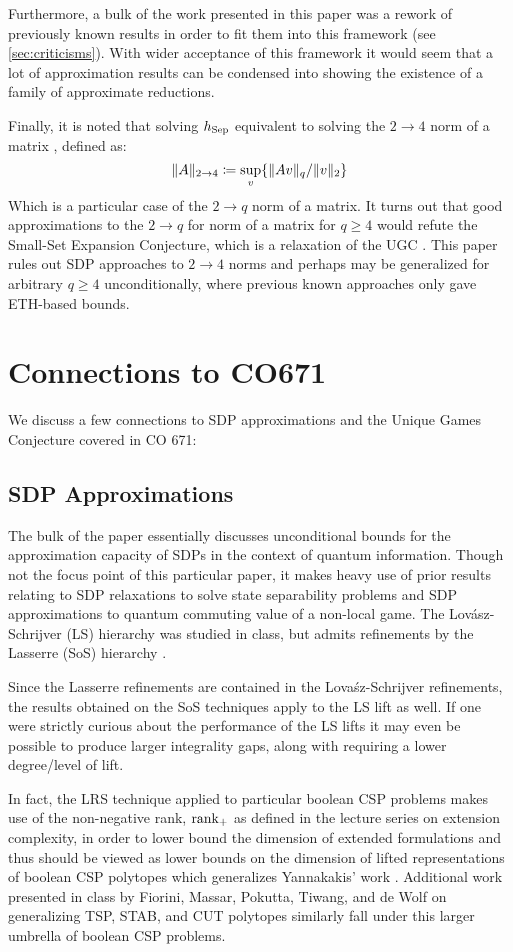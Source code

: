 \documentclass[runningheads,a4paper,english]{llncs}[2022/01/12]
\begin{document}
Furthermore, a bulk of the work presented in this paper was a rework of previously known results in order to fit them into this framework (see \cref{sec:criticisms}). 
With wider acceptance of this framework it would seem that a lot of approximation results can be condensed into showing the existence of a family of approximate reductions.

Finally, it is noted that solving $h_{\operatorname{Sep}}$ equivalent to solving the $2\to 4$ norm of a matrix \cite{Barak_2012}, defined as:
\[\lVert A\rVert_{2\to 4} \coloneq \sup_v \{\lVert Av\rVert_q/\lVert v\rVert_2\}\]
Which is a particular case of the $2\to q$ norm of a matrix.
It turns out that good approximations to the $2\to q$ for norm of a matrix for $q \ge 4$ would refute the Small-Set Expansion Conjecture, which is a relaxation of the UGC \cite{Barak_2012}.
This paper rules out SDP approaches to $2\to 4$ norms and perhaps may be generalized for arbitrary $q \ge 4$ unconditionally, where previous known approaches only gave ETH-based bounds.

\section{Connections to CO671}
We discuss a few connections to SDP approximations and the Unique Games Conjecture covered in CO 671:
\subsection{SDP Approximations}
The bulk of the paper essentially discusses unconditional bounds for the approximation capacity of SDPs in the context of quantum information.
Though not the focus point of this particular paper, it makes heavy use of prior results relating to SDP relaxations to solve state separability problems and SDP approximations to quantum commuting value of a non-local game.
The Lov\'asz-Schrijver (LS) hierarchy was studied in class, but admits refinements by the Lasserre (SoS) hierarchy \cite{laurent2003comparison}.

Since the Lasserre refinements are contained in the Lova\'sz-Schrijver refinements, the results obtained on the SoS techniques apply to the LS lift as well.
If one were strictly curious about the performance of the LS lifts it may even be possible to produce larger integrality gaps, along with requiring a lower degree/level of lift.

In fact, the LRS technique applied to particular boolean CSP problems makes use of the non-negative rank, $\operatorname{rank}_+$ as defined in the lecture series on extension complexity, in order to lower bound the dimension of extended formulations and thus should be viewed as lower bounds on the dimension of lifted representations of boolean CSP polytopes which generalizes Yannakakis' work \cite{yannakakis1988expressing}.
Additional work presented in class by Fiorini, Massar, Pokutta, Tiwang, and de Wolf \cite{fiorini2015exponential} on generalizing TSP, STAB, and CUT polytopes similarly fall under this larger umbrella of boolean CSP problems.
\end{document}
